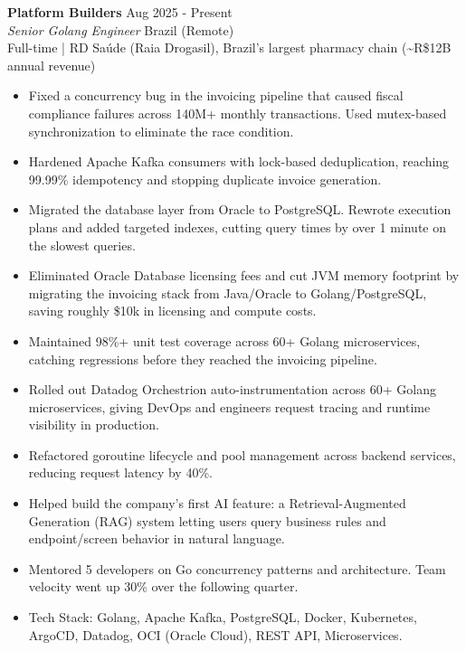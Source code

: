 \documentclass[10pt,a4paper]{article}
\newcommand{\rolehead}[4]{%
    \needspace{4\baselineskip}%
    \textbf{#1} \hfill #2\\
    \textit{#3} \hfill #4\\
}
\begin{document}
\rolehead{Platform Builders}{Aug 2025 - Present}{Senior Golang Engineer}{Brazil (Remote)}
{\footnotesize Full-time | RD Sa\'{u}de (Raia Drogasil), Brazil's largest pharmacy chain (\textasciitilde R\$12B annual revenue)}
\nopagebreak
\begin{itemize}
    \item {\footnotesize Fixed a concurrency bug in the invoicing pipeline that caused fiscal compliance failures across 140M+ monthly transactions. Used mutex-based synchronization to eliminate the race condition.}
    \item {\footnotesize Hardened Apache Kafka consumers with lock-based deduplication, reaching 99.99\% idempotency and stopping duplicate invoice generation.}
    \item {\footnotesize Migrated the database layer from Oracle to PostgreSQL. Rewrote execution plans and added targeted indexes, cutting query times by over 1 minute on the slowest queries.}
    \item {\footnotesize Eliminated Oracle Database licensing fees and cut JVM memory footprint by migrating the invoicing stack from Java/Oracle to Golang/PostgreSQL, saving roughly \$10k in licensing and compute costs.}
    \item {\footnotesize Maintained 98\%+ unit test coverage across 60+ Golang microservices, catching regressions before they reached the invoicing pipeline.}
    \item {\footnotesize Rolled out Datadog Orchestrion auto-instrumentation across 60+ Golang microservices, giving DevOps and engineers request tracing and runtime visibility in production.}
    \item {\footnotesize Refactored goroutine lifecycle and pool management across backend services, reducing request latency by 40\%.}
    \item {\footnotesize Helped build the company's first AI feature: a Retrieval-Augmented Generation (RAG) system letting users query business rules and endpoint/screen behavior in natural language.}
    \item {\footnotesize Mentored 5 developers on Go concurrency patterns and architecture. Team velocity went up 30\% over the following quarter.}
    \item {\footnotesize Tech Stack: Golang, Apache Kafka, PostgreSQL, Docker, Kubernetes, ArgoCD, Datadog, OCI (Oracle Cloud), REST API, Microservices.}
\end{itemize}
\end{document}
